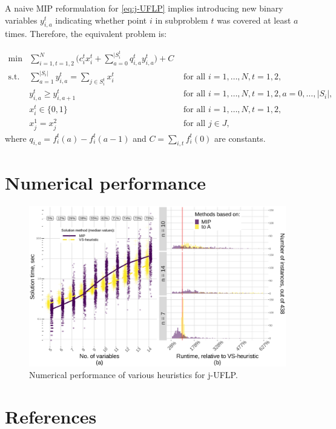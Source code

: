 \documentclass[11pt]{article}
\begin{document}
A naive MIP reformulation for \eqref{eq:j-UFLP} implies introducing new binary
variables \(y_{i,a}^t\) indicating whether point \(i\) in subproblem \(t\) was covered
at least \(a\) times. Therefore, the equivalent problem is:

\begin{subequations}\label{eq:j-UFLP-MIP}
\begin{align}\tag{j-UFLP-MIP}
  \min & \sum_{i=1, t=1,2}^N \Big(c^t_i x^t_i + \sum_{a=0}^{|S_i^t}q_{i,a}^t y^t_{i,a}\Big)+C&\\
    \textrm{s.t. } & \sum_{a=1}^{|S_i|} y_{i,a}^t = \sum_{j\in S^t_i} x^t_i& \textrm{ for all } i=1,\ldots, N, t=1,2,\\
    & y^t_{i,a} \geq y^t_{i, a+1} & \textrm{ for all }i=1, \ldots, N, t=1,2, a=0,\ldots,|S_i|,\\
    & x^t_i\in\{0,1\} & \textrm{ for all } i=1,\ldots,N, t=1,2,\\
    & x^1_j = x^2_j & \textrm{ for all } j\in J,\label{eq:link}
\end{align}
\end{subequations}
where \(q_{i,a}=f_i^t(a)-f_i^t(a-1)\) and \(C=\sum_{i,t} f_i^t(0)\) are constants.

\section{Numerical performance}
\label{sec:org519abe5}

  \begin{figure}%
    \centering
    \includegraphics[width=\textwidth]{./jUFLP.eps}%
    \caption{Numerical performance of various heuristics for j-UFLP.}%
    \label{fig:jUFLP-nums}%
\end{figure}
\section{References}
\label{sec:orge9cac9d}
\printbibliography
\end{document}
